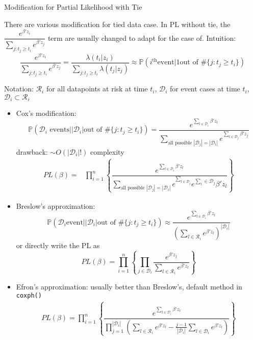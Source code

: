\begin{point}
    Modification for Partial Likelihood with Tie
\end{point}

There are various modification for tied data case. In PL without tie, the $ \dfrac{e^{\beta 'z_i}}{\sum_{j:t_j\geq t_i}e^{\beta 'z_j}} $ term are usually changed to adapt for the case of. Intuition:
\begin{equation}
    \dfrac{e^{\beta 'z_i}}{\sum_{j:t_j\geq t_i}e^{\beta 'z_j}}=\dfrac{\lambda (t_i|z_i)}{\sum_{j:t_j\geq t_i}\lambda (t_j|z_j)}\approx \mathbb{P}\left( i^\mathrm{th} \text{event}|1\text{out of }\# \{j:t_j\geq t_i\}  \right) 
\end{equation}

Notation: $\mathcal{R}_i $ for all datapoints at risk at time $ t_i $, $ \mathcal{D}_i $ for event cases at time $ t_i $, $ \mathcal{D}_i\subset \mathcal{R}_i $
\begin{itemize}[topsep=2pt,itemsep=0pt]
    \item Cox's modification:
    \begin{equation}
        \mathbb{P}\left( \mathcal{D}_i \text{ events}\Big| |\mathcal{D}_i |\text{out of }\# \{j:t_j\geq t_i\}  \right)=\dfrac{e^{\sum_{l\in\mathcal{D}_i }\beta'z_l }}{\sum_{\text{all possible }|\mathcal{D}_j|=|\mathcal{D}_i | }e^{\sum_{l\in\mathcal{D}_j }\beta'z_j} }
    \end{equation}
    drawback: $ \sim O(|\mathcal{D}_i|!) $ complexity
    \begin{align}
        PL(\beta )=&\prod_{i=1}^n\left\{ \dfrac{e^{\sum_{l\in\mathcal{D}_i}\beta 'z_l}}{\sum_{\text{all possible }|\mathcal{D}_j|=|\mathcal{D}_i|}e^{\sum_{l\in\mathcal{D}_j}}e^{\sum_{l}\in\mathcal{D}_j}\beta 'z_l} \right\} 
    \end{align}
    
    
    \item Breslow's approximation:
    \begin{equation}
        \mathbb{P}\left( \mathcal{D}_i \text{event}\Big| |\mathcal{D}_i |\text{out of }\# \{j:t_j\geq t_i\}  \right)\approx \dfrac{e^{\sum_{l\in\mathcal{D}_i }\beta'z_l }}{\left(\sum_{l\in\mathcal{R}_i}e^{\beta 'z_l}\right)^{|\mathcal{D}_i|}}
    \end{equation}
    or directly write the PL as
    \begin{equation}
        PL(\beta )=\prod_{i=1}^n \left\{ \prod_{j\in\mathcal{D}_i}\dfrac{e^{\beta 'z_j}}{\sum_{l\in\mathcal{R}_i}e^{\beta 'z_l}} \right\}
    \end{equation}
    \item Efron's approximation: usually better than Breslow's, default method in \lstinline|coxph()|
    \begin{align}
        PL(\beta )=\prod_{i=1}^n\left\{ \dfrac{e^{\sum_{l\in\mathcal{D}_i}\beta 'z_l}}{ \prod_{j=1}^{|\mathcal{D}_i|}\left( \sum_{l\in\mathcal{R}_i}e^{\beta 'z_l}-\frac{j-1}{|\mathcal{D}_i|}\sum_{l\in\mathcal{D}_i}e^{\beta 'z_l} \right) } \right\} 
    \end{align}
    
    
\end{itemize}


